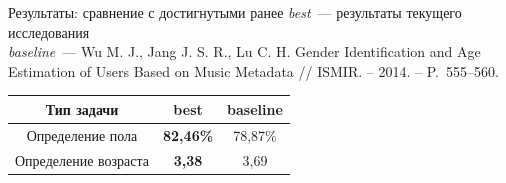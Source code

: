 \documentclass{beamer}
\newcommand{\prevGender}{78,87\%}
\newcommand{\prevAge}{3,69}
\newcommand{\bestGender}{82,46\%}
\newcommand{\bestAge}{3,38}
\begin{document}
\begin{frame}{Результаты: сравнение с достигнутыми ранее}
    \textit{best}~--- результаты текущего исследования \\
    \textit{baseline}~--- Wu M. J.,
        Jang J. S. R., Lu C. H. Gender Identification
        and Age Estimation of Users Based on Music 
        Metadata // ISMIR. – 2014. – P.~555--560.
    \begin{table}[h!]
    \centering
    \begin{tabular}{|c|c|c|}
    \hline
    \textbf{Тип задачи} & \textbf{best} & \textbf{baseline} \tabularnewline
    \hline
    Определение пола & \textbf{\bestGender} & \prevGender \tabularnewline
    \hline
    Определение возраста & \textbf{\bestAge} & \prevAge \tabularnewline
    \hline
    \end{tabular}
    \label{tab:total_results}
    \end{table}
\end{frame}

\begin{frame}
    \titlepage
\end{frame}
\end{document}
